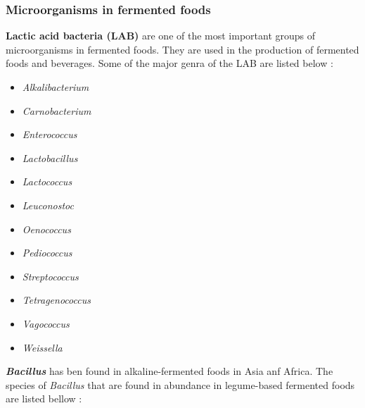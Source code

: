 \subsubsection*{Microorganisms in fermented foods}

\textbf{Lactic acid bacteria (LAB)} are one of the most important groups of microorganisms in fermented foods. They are used in the production of fermented foods and beverages. Some of the major genra of the LAB are listed below \cite*{L1-DiversityMicro}:
\begin{highlight}
    \begin{multicols}{3}
        \begin{itemize}
            \item \textit{Alkalibacterium}
            \item \textit{Carnobacterium}
            \item \textit{Enterococcus}
            \item \textit{Lactobacillus}
            \item \textit{Lactococcus}
            \item \textit{Leuconostoc}
            \item \textit{Oenococcus}
            \item \textit{Pediococcus}
            \item \textit{Streptococcus}
            \item \textit{Tetragenococcus}
            \item \textit{Vagococcus}
            \item \textit{Weissella}
        \end{itemize}
    \end{multicols}
\end{highlight}

\textbf{\textit{Bacillus}} has ben found in alkaline-fermented foods in Asia anf Africa. The species of \textit{Bacillus} that are found in abundance in legume-based fermented foods are listed bellow \cite*{L1-DiversityMicro}:

